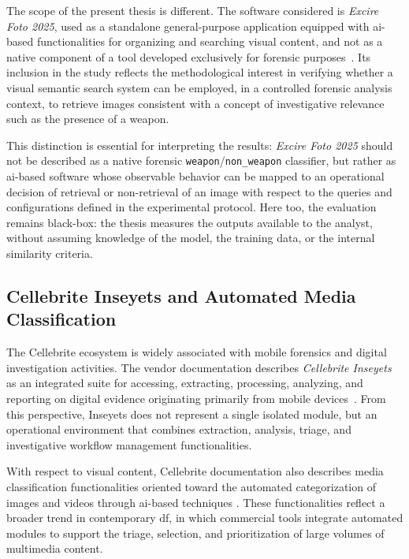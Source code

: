 The scope of the present thesis is different. The software considered is
\textit{Excire Foto 2025}, used as a standalone general-purpose application
equipped with \gls{ai}-based functionalities for organizing and searching
visual content, and not as a native component of a tool developed exclusively
for forensic purposes~\cite{excirefoto2025_official}. Its inclusion in the
study reflects the methodological interest in verifying whether a visual
semantic search system can be employed, in a controlled forensic analysis
context, to retrieve images consistent with a concept of investigative
relevance such as the presence of a weapon.

This distinction is essential for interpreting the results: \textit{Excire Foto
2025} should not be described as a native forensic
\texttt{weapon}/\texttt{non\_weapon} classifier, but rather as \gls{ai}-based
software whose observable behavior can be mapped to an operational decision of
retrieval or non-retrieval of an image with respect to the queries and
configurations defined in the experimental protocol. Here too, the evaluation
remains black-box: the thesis measures the outputs available to the analyst,
without assuming knowledge of the model, the training data, or the internal
similarity criteria.


\subsection{Cellebrite Inseyets and Automated Media Classification}
\label{subsec:sota_cellebrite}
The Cellebrite ecosystem is widely associated with mobile forensics and digital
investigation activities. The vendor documentation describes \textit{Cellebrite
Inseyets} as an integrated suite for accessing, extracting, processing,
analyzing, and reporting on digital evidence originating primarily from mobile
devices~\cite{cellebrite_inseyets_official}. From this perspective, Inseyets
does not represent a single isolated module, but an operational environment
that combines extraction, analysis, triage, and investigative workflow
management functionalities.

With respect to visual content, Cellebrite documentation also describes media
classification functionalities oriented toward the automated categorization of
images and videos through \gls{ai}-based techniques
\cite{cellebrite,cellebrite_media_classification}. These
functionalities reflect a broader trend in contemporary \gls{df}, in which
commercial tools integrate automated modules to support the triage, selection,
and prioritization of large volumes of multimedia content.

